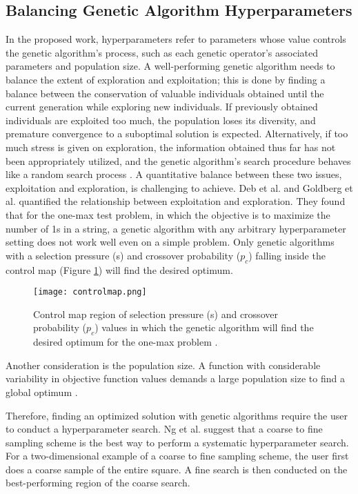 \subsection{Balancing Genetic Algorithm Hyperparameters}
In the proposed work, hyperparameters refer to parameters whose value controls 
the genetic algorithm's process, such as each genetic operator's associated parameters 
and population size.  
A well-performing genetic algorithm needs to balance the extent of exploration and 
exploitation; this is done by finding a balance between the conservation of 
valuable individuals obtained until the current generation while exploring new 
individuals. 
If previously obtained individuals are exploited too much, the population loses 
its diversity, and premature convergence to a suboptimal solution is expected. 
Alternatively, if too much stress is given on exploration, the information obtained 
thus far has not been appropriately utilized, and the genetic algorithm's search procedure 
behaves like a random search process \cite{deb_multi-objective_2001}. 
A quantitative balance between these two issues, exploitation and exploration, 
is challenging to achieve. 
Deb et al. \cite{deb_multi-objective_2001} and Goldberg et al. 
\cite{goldberg_toward_1993} quantified the relationship between exploitation 
and exploration. 
They found that for the one-max test problem, in which the objective is to 
maximize the number of 1s in a string, a genetic algorithm with any arbitrary 
hyperparameter setting does not work well even on a simple problem. 
Only genetic algorithms with a selection pressure (s) and crossover probability ($p_c$) 
falling inside the control map (Figure \ref{fig:controlmap}) will find the desired 
optimum.  
\begin{figure}[]
    \centering
    \texttt{[image: controlmap.png]} 
    \caption{Control map region of selection pressure (s) and crossover probability ($p_c$)
    values in which the genetic algorithm will find the desired optimum for the 
    one-max problem \cite{goldberg_toward_1993,deb_multi-objective_2001}.}
    \label{fig:controlmap}
\end{figure}
Another consideration is the population size. 
A function with considerable variability in objective function values demands 
a large population size to find a global optimum \cite{deb_multi-objective_2001}. 

Therefore, finding an optimized solution with genetic algorithms require the user 
to conduct a hyperparameter search. 
Ng et al. \cite{ng_improving_2021} suggest that a coarse to fine sampling scheme 
is the best way to perform a systematic hyperparameter search.  
For a two-dimensional example of a coarse to fine sampling scheme, the user 
first does a coarse sample of the entire square. 
A fine search is then conducted on the best-performing region of the coarse 
search. 


